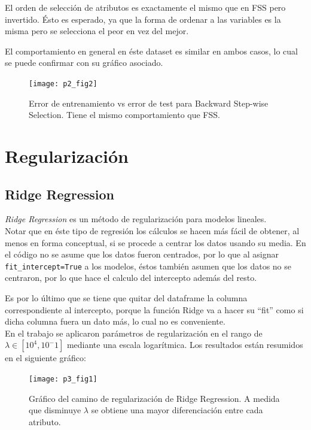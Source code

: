 \documentclass[letter, 10pt]{article}
\begin{document}
El orden de selección de atributos es exactamente el mismo que en FSS pero
invertido. Ésto es esperado, ya que la forma de ordenar a las variables es la
misma pero se selecciona el peor en vez del mejor.

El comportamiento en general en éste dataset es similar en ambos casos, lo cual
se puede confirmar con su gráfico asociado.

\begin{figure}[H]
  \centering
 \texttt{[image: p2\_fig2]} 
  \caption{Error de entrenamiento vs error de test para Backward Step-wise
    Selection. Tiene el mismo comportamiento que FSS.}
  \label{fig:p2_g2}
\end{figure}
\section{Regularización}

\subsection{Ridge Regression}
\textit{Ridge Regression} es un método de regularización para modelos
lineales.\\

Notar que en éste tipo de regresión los cálculos se hacen más fácil de obtener,
al menos en forma conceptual, si se procede a centrar los datos usando su media.
En el código no se asume que los datos fueron centrados, por lo que al asignar
\texttt{fit\_intercept=True} a los modelos, éstos también asumen que los datos no
se centraron, por lo que hace el calculo del intercepto además del resto.


Es por lo último que se tiene que quitar del dataframe la columna
correspondiente al intercepto, porque la función Ridge va a hacer su ``fit''
como si dicha columna fuera un dato más, lo cual no es conveniente.\\


En el trabajo se aplicaron parámetros de regularización en el rango de $\lambda
\in [10^4,10^-1]$ mediante una escala logarítmica. Los resultados están resumidos
en el siguiente gráfico:

\begin{figure}[H]
  \centering
  \texttt{[image: p3\_fig1]} 
  \caption{Gráfico del camino de regularización de Ridge Regression. A medida
    que disminuye $\lambda$ se obtiene una mayor diferenciación entre cada atributo.}
  \label{fig:p3_g1}
\end{figure}
\end{document}
